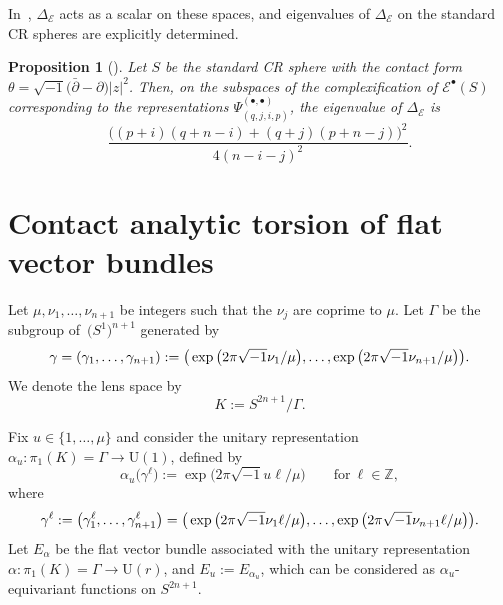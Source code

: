 \documentclass[10pt,a4paper]{amsart}
\numberwithin{equation}{section}
\newtheorem{Proposition}[Theorem]{Proposition}
 { \theoremstyle{definition}
\newtheorem{Definition}[Theorem]{Definition}
\newtheorem{Note}[Theorem]{Note}
\newtheorem{Example}[Theorem]{Example}
\newtheorem{Remark}[Theorem]{Remark} }
\newcommand{\ii}{\sqrt{-1}}
\newcommand{\RN}{\cE}
\newcommand{\cE}{\mathcal{E}}
\begin{document}
In~\cite{Kitaoka-19},
$\Delta_{\cE}$ acts as a scalar on these spaces,
and
eigenvalues of $\Delta_\RN $
on the standard CR spheres are explicitly determined.
\begin{Proposition}[{\cite[Theorem 0.1]{Kitaoka-19}}]
\label{prop:all eigenvalues of the Rumin Laplacian on sphere}
Let $S$ be the standard CR sphere with the contact form $\theta = \sqrt{-1} \big(\bar{\partial} - \partial\big) |z|^2$.
Then, on the subspaces of the complexification of $\cE ^\bullet (S)$
corresponding to the representations
$\Psi_{(q,j,i,p)}^{(\bullet , \bullet )}$,
the eigenvalue of $\Delta_\RN $ is
\[
\frac{\big( ( p +i )(q +n -i) + ( q +j )(p +n -j) \big)^2}{4 (n-i-j)^2 } .
\]
\end{Proposition}



\section{Contact analytic torsion of flat vector bundles}
\label{sec:on_flat_vector_bundles}

Let $\mu , \nu_1 , \ldots , \nu_{n+1}$ be integers such that the $\nu_j$ are coprime to $\mu$.
Let $\Gamma$ be the subgroup of~$\big(S^1\big)^{n+1}$ generated by
\begin{equation}
 \gamma
 = ( \gamma_1 , \ldots , \gamma_{n+1} )
 := \big( \exp \big( 2 \pi \ii \nu_1 / \mu \big), \dots , \exp \big( 2 \pi \ii \nu_{n+1} / \mu \big) \big) .
 \notag
\end{equation}
We denote the lens space by
\[
 K
 :=
 S^{2n+1} / \Gamma
 .
\]


Fix $u \in \{ 1, \ldots , \mu \}$ and consider the unitary representation $\alpha_u \colon \pi_1 (K) = \Gamma \to \mathrm{U} (1)$, defined by
\[
 \alpha_u \big( \gamma^{\ell} \big) := \exp \big( 2 \pi \ii u \ell / \mu \big)
 \qquad \text{for} \ \ell \in \mathbb{Z}
 ,
\]
where
\begin{equation}
 \gamma^{\ell}
 := \big( \gamma_1^{\ell} , \ldots , \gamma_{n+1}^{\ell} \big)
 = \big( \exp \big( 2 \pi \ii \nu_1 \ell / \mu \big), \dots , \exp \big( 2 \pi \ii \nu_{n+1} \ell / \mu \big) \big) .
 \notag
\end{equation}
Let $E_{\alpha}$ be the flat vector bundle associated with the unitary representation ${\alpha \colon \pi_1 (K) = \Gamma \! \to \! \mathrm{U} (r)}$, and $E_{u} := E_{\alpha_u}$, which can be considered as $\alpha_u$-equivariant functions on $S^{2n+1}$.
\end{document}
